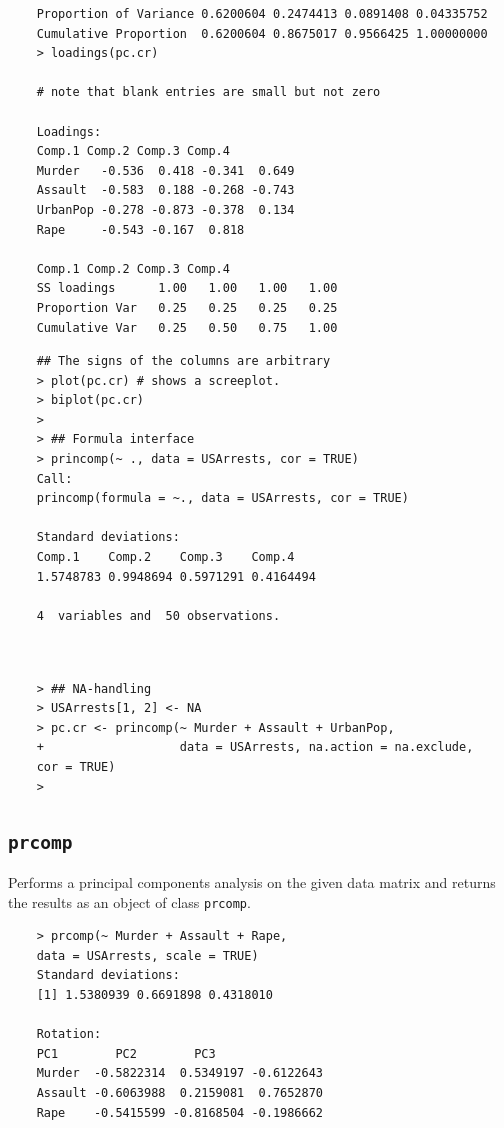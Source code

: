 \documentclass[]{article}
\begin{document}
\[ \mbox{ } \]

\newpage

\begin{framed}
	\begin{verbatim}
	Proportion of Variance 0.6200604 0.2474413 0.0891408 0.04335752
	Cumulative Proportion  0.6200604 0.8675017 0.9566425 1.00000000
	> loadings(pc.cr)  
	
	# note that blank entries are small but not zero
	
	Loadings:
	Comp.1 Comp.2 Comp.3 Comp.4
	Murder   -0.536  0.418 -0.341  0.649
	Assault  -0.583  0.188 -0.268 -0.743
	UrbanPop -0.278 -0.873 -0.378  0.134
	Rape     -0.543 -0.167  0.818       
	
	Comp.1 Comp.2 Comp.3 Comp.4
	SS loadings      1.00   1.00   1.00   1.00
	Proportion Var   0.25   0.25   0.25   0.25
	Cumulative Var   0.25   0.50   0.75   1.00
	\end{verbatim}
\end{framed}
\newpage
\begin{framed}
	\begin{verbatim}
	## The signs of the columns are arbitrary
	> plot(pc.cr) # shows a screeplot.
	> biplot(pc.cr)
	> 
	> ## Formula interface
	> princomp(~ ., data = USArrests, cor = TRUE)
	Call:
	princomp(formula = ~., data = USArrests, cor = TRUE)
	
	Standard deviations:
	Comp.1    Comp.2    Comp.3    Comp.4 
	1.5748783 0.9948694 0.5971291 0.4164494 
	
	4  variables and  50 observations.
	
	
	\end{verbatim}
\end{framed}
\newpage
\begin{framed}
	\begin{verbatim}
	> ## NA-handling
	> USArrests[1, 2] <- NA
	> pc.cr <- princomp(~ Murder + Assault + UrbanPop,
	+                   data = USArrests, na.action = na.exclude, 
	cor = TRUE)
	> 
	\end{verbatim}
\end{framed}
\subsection*{\texttt{prcomp}}
Performs a principal components analysis on the given data matrix and returns the results as an object of class \texttt{prcomp}.

\newpage
\begin{framed}
	\begin{verbatim}
	> prcomp(~ Murder + Assault + Rape, 
	data = USArrests, scale = TRUE)
	Standard deviations:
	[1] 1.5380939 0.6691898 0.4318010
	
	Rotation:
	PC1        PC2        PC3
	Murder  -0.5822314  0.5349197 -0.6122643
	Assault -0.6063988  0.2159081  0.7652870
	Rape    -0.5415599 -0.8168504 -0.1986662
	\end{verbatim}
\end{framed}
\end{document}
